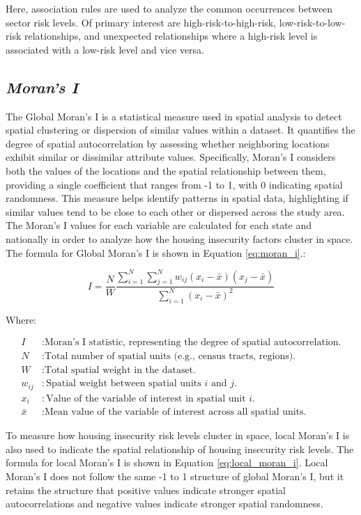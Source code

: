 Here, association rules are used to analyze the common occurrences between sector risk levels. Of primary interest are high-risk-to-high-risk, low-risk-to-low-risk relationships, and unexpected relationships where a high-risk level is associated with a low-risk level and vice versa. 


\subsection{\textit{Moran's I}}
The Global Moran's I is a statistical measure used in spatial analysis to detect spatial clustering or dispersion of similar values within a dataset. It quantifies the degree of spatial autocorrelation by assessing whether neighboring locations exhibit similar or dissimilar attribute values. Specifically, Moran's I considers both the values of the locations and the spatial relationship between them, providing a single coefficient that ranges from -1 to 1, with 0 indicating spatial randomness. This measure helps identify patterns in spatial data, highlighting if similar values tend to be close to each other or dispersed across the study area. The Moran's I values for each variable are calculated for each state and nationally in order to analyze how the housing insecurity factors cluster in space. The formula for Global Moran's I is shown in Equation \ref{eq:moran_i}.:

\begin{equation}\label{eq:moran_i}
    I = \frac{N}{W} \frac{\sum_{i=1}^{N} \sum_{j=1}^{N} w_{ij} (x_i - \bar{x})(x_j - \bar{x})}{\sum_{i=1}^{N} (x_i - \bar{x})^2}
\end{equation}

Where:

\begin{align*}
I & : \text{Moran's I statistic, representing the degree of spatial autocorrelation.} \\
N & : \text{Total number of spatial units (e.g., census tracts, regions).} \\
W & : \text{Total spatial weight in the dataset.} \\
w_{ij} & : \text{Spatial weight between spatial units \(i\) and \(j\).} \\
x_i & : \text{Value of the variable of interest in spatial unit \(i\).} \\
\bar{x} & : \text{Mean value of the variable of interest across all spatial units.}
\end{align*}

To measure how housing insecurity risk levels cluster in space, local Moran's I is also used to indicate the spatial relationship of housing insecurity risk levels. The formula for local Moran's I is shown in Equation \ref{eq:local_moran_i}. Local Moran's I does not follow the same -1 to 1 structure of global Moran's I, but it retains the structure that positive values indicate stronger spatial autocorrelations and negative values indicate stronger spatial randomness. 

